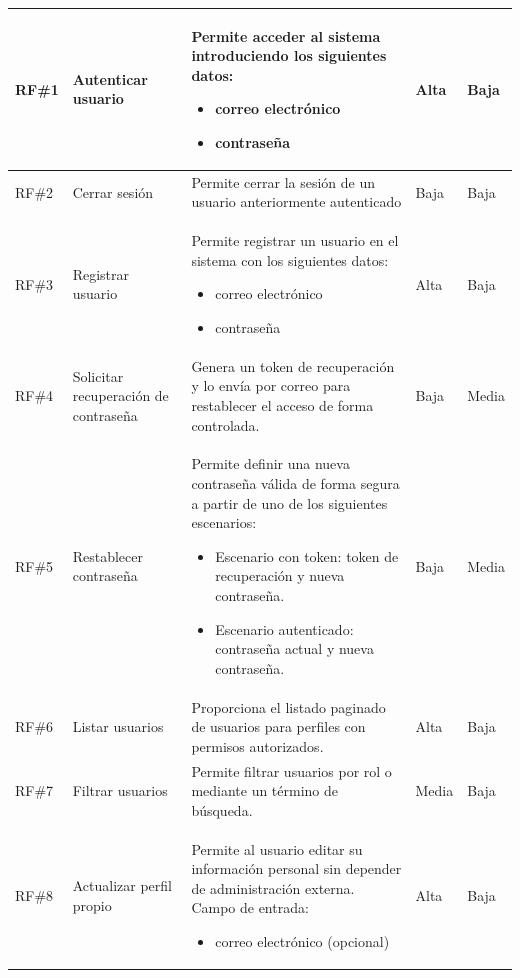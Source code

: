 \begin{longtable}{|p{1cm}|p{4cm}|p{5.2cm}|p{1.9cm}|p{1.9cm}|}
	\rowcolor[HTML]{EDEBF1}
	\ac{RF}\#1 & Autenticar usuario & Permite acceder al sistema introduciendo los siguientes datos: 
		\begin{itemize}
			\item correo electrónico
			\item contraseña
		\end{itemize}
	& Alta & Baja \\ 
    \hline
    \ac{RF}\#2 & Cerrar sesión & Permite cerrar la sesión de un usuario anteriormente autenticado & Baja & Baja \\  
    \hline
    \rowcolor[HTML]{EDEBF1}
	\ac{RF}\#3 & Registrar usuario & Permite registrar un usuario en el sistema con los siguientes datos: 
		\begin{itemize}
				\item correo electrónico
				\item contraseña
		\end{itemize}
	& Alta & Baja \\ 
    \hline
	\ac{RF}\#4 & Solicitar recuperación de contraseña & Genera un token de recuperación y lo envía por correo para restablecer el acceso de forma controlada. & Baja & Media \\
	\hline
	\rowcolor[HTML]{EDEBF1}
    \ac{RF}\#5 & Restablecer contraseña & Permite definir una nueva contraseña válida de forma segura a partir de uno de los siguientes escenarios: 
		\begin{itemize}
				\item Escenario con token: token de recuperación y nueva contraseña.
				\item Escenario autenticado: contraseña actual y nueva contraseña.
		\end{itemize}
	& Baja & Media \\
	\hline
	\ac{RF}\#6 & Listar usuarios & Proporciona el listado paginado de usuarios para perfiles con permisos autorizados. & Alta & Baja \\
	\hline
    \rowcolor[HTML]{EDEBF1}
	\ac{RF}\#7 & Filtrar usuarios & Permite filtrar usuarios por rol o mediante un término de búsqueda. & Media & Baja \\
	\hline
	\ac{RF}\#8 & Actualizar perfil propio & Permite al usuario editar su información personal sin depender de administración externa. Campo de entrada: 
		\begin{itemize}
			\item correo electrónico (opcional)
		\end{itemize}
	& Alta & Baja \\

\end{longtable}
